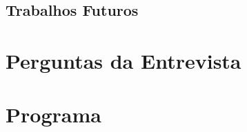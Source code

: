 \documentclass[openright]{normas-utf-tex} %
\begin{document}
	\section{Trabalhos Futuros}
		

\clearpage %
\label{bibstart}
\label{bibend}

\apendice
\chapter{Perguntas da Entrevista}
\label{pergunta}


\chapter{Programa}
\label{program}

\end{document}
